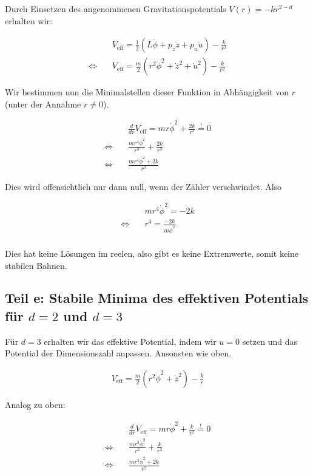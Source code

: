 \documentclass[a4paper,german,12pt,smallheadings]{scrartcl}
\begin{document}
Durch Einsetzen des angenommenen Gravitationspotentials $V(r) = -kr^{2-d}$
erhalten wir:

\begin{align*}
  &V_{\text{eff}} = \frac{1}{2}(L\dot{\phi} + p_z\dot{z} + p_u \dot{u}) - \frac{k}{r^2} \\
  \Leftrightarrow\quad&V_{\text{eff}} = \frac{m}{2}(r^2\dot{\phi}^2 + \dot{z}^2 + \dot{u}^2) - \frac{k}{r^2}
\end{align*}

Wir bestimmen nun die Minimalstellen dieser Funktion in Abhängigkeit von $r$
(unter der Annahme $r \neq 0$).

\begin{align*}
  &\frac{d}{dr} V_{\text{eff}} = mr\dot{\phi}^2 + \frac{2k}{r^3} \overset{!}{=} 0 \\
  \Leftrightarrow\quad&\frac{mr^4\dot{\phi}^2}{r^3} + \frac{2k}{r^3} \\
  \Leftrightarrow\quad&\frac{mr^4\dot{\phi}^2 + 2k}{r^3}
\end{align*}

Dies wird offensichtlich nur dann null, wenn der Zähler verschwindet. Also

\begin{align*}
  &mr^4\dot{\phi}^2 = -2k \\
  \Leftrightarrow\quad &r^4 = \frac{-2k}{m\dot{\phi}^2} \\
\end{align*}

Dies hat keine Lösungen im reelen, also gibt es keine Extremwerte, somit keine stabilen Bahnen.

\subsection*{Teil e: Stabile Minima des effektiven Potentials für $d=2$ und $d=3$}

Für $d = 3$ erhalten wir das effektive Potential, indem wir $u = 0$ setzen und
das Potential der Dimensionszahl anpassen. Ansonsten wie oben.

\begin{align*}
  V_{\text{eff}} = \frac{m}{2}(r^2\dot{\phi}^2 + \dot{z}^2) - \frac{k}{r}
\end{align*}

Analog zu oben:

\begin{align*}
  &\frac{d}{dr} V_{\text{eff}} = mr\dot{\phi}^2 + \frac{k}{r^2} \overset{!}{=} 0 \\
  \Leftrightarrow\quad&\frac{mr^3\dot{\phi}^2}{r^2} + \frac{k}{r^2} \\
  \Leftrightarrow\quad&\frac{mr^3\dot{\phi}^2 + 2k}{r^2}
\end{align*}
\end{document}
